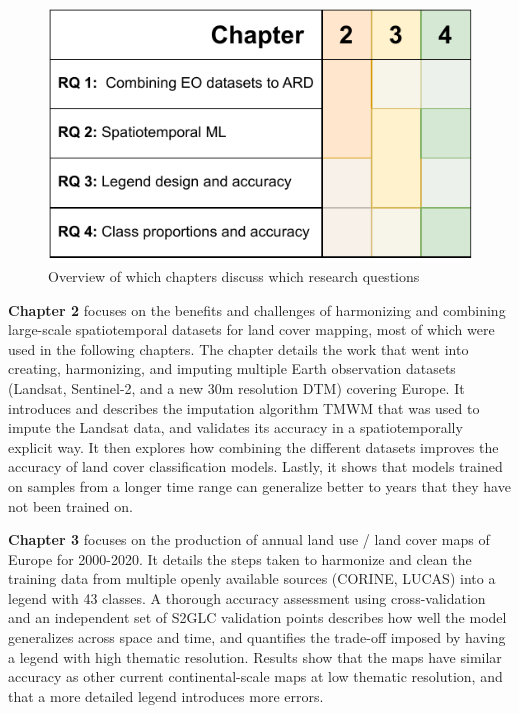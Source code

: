 \begin{figure}
    \centering
    \includegraphics[width=\textwidth]{figs_01/fig_rqs_chapters.pdf}
    \caption{Overview of which chapters discuss which research questions}
    \label{fig:01_rqs_chapters}
\end{figure}


\textbf{Chapter 2} focuses on the benefits and challenges of harmonizing and combining large-scale spatiotemporal datasets for land cover mapping, most of which were used in the following chapters. The chapter details the work that went into creating, harmonizing, and imputing multiple Earth observation datasets (Landsat, Sentinel-2, and a new 30m resolution DTM) covering Europe. It introduces and describes the imputation algorithm TMWM that was used to impute the Landsat data, and validates its accuracy in a spatiotemporally explicit way. It then explores how combining the different datasets improves the accuracy of land cover classification models. Lastly, it shows that models trained on samples from a longer time range can generalize better to years that they have not been trained on.


\textbf{Chapter 3} focuses on the production of annual land use / land cover maps of Europe for 2000-2020. It details the steps taken to harmonize and clean the training data from multiple openly available sources (CORINE, LUCAS) into a legend with 43 classes. A thorough accuracy assessment using cross-validation and an independent set of S2GLC validation points describes how well the model generalizes across space and time, and quantifies the trade-off imposed by having a legend with high thematic resolution. Results show that the maps have similar accuracy as other current continental-scale maps at low thematic resolution, and that a more detailed legend introduces more errors.

